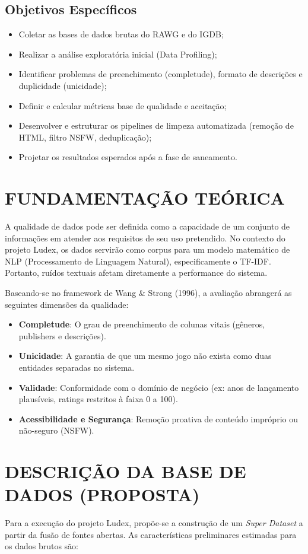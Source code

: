 \documentclass[12pt,a4paper]{article}
\begin{document}
\subsection{Objetivos Específicos}
\begin{itemize}
    \item Coletar as bases de dados brutas do RAWG e do IGDB;
    \item Realizar a análise exploratória inicial (Data Profiling);
    \item Identificar problemas de preenchimento (completude), formato de descrições e duplicidade (unicidade);
    \item Definir e calcular métricas base de qualidade e aceitação;
    \item Desenvolver e estruturar os pipelines de limpeza automatizada (remoção de HTML, filtro NSFW, deduplicação);
    \item Projetar os resultados esperados após a fase de saneamento.
\end{itemize}

\section{FUNDAMENTAÇÃO TEÓRICA}
A qualidade de dados pode ser definida como a capacidade de um conjunto de informações em atender aos requisitos de seu uso pretendido. No contexto do projeto Ludex, os dados servirão como corpus para um modelo matemático de NLP (Processamento de Linguagem Natural), especificamente o TF-IDF. Portanto, ruídos textuais afetam diretamente a performance do sistema.

Baseando-se no framework de Wang \& Strong (1996), a avaliação abrangerá as seguintes dimensões da qualidade:
\begin{itemize}
    \item \textbf{Completude}: O grau de preenchimento de colunas vitais (gêneros, publishers e descrições).
    \item \textbf{Unicidade}: A garantia de que um mesmo jogo não exista como duas entidades separadas no sistema.
    \item \textbf{Validade}: Conformidade com o domínio de negócio (ex: anos de lançamento plausíveis, ratings restritos à faixa 0 a 100).
    \item \textbf{Acessibilidade e Segurança}: Remoção proativa de conteúdo impróprio ou não-seguro (NSFW).
\end{itemize}

\section{DESCRIÇÃO DA BASE DE DADOS (PROPOSTA)}
Para a execução do projeto Ludex, propõe-se a construção de um \textit{Super Dataset} a partir da fusão de fontes abertas. As características preliminares estimadas para os dados brutos são:
\end{document}
